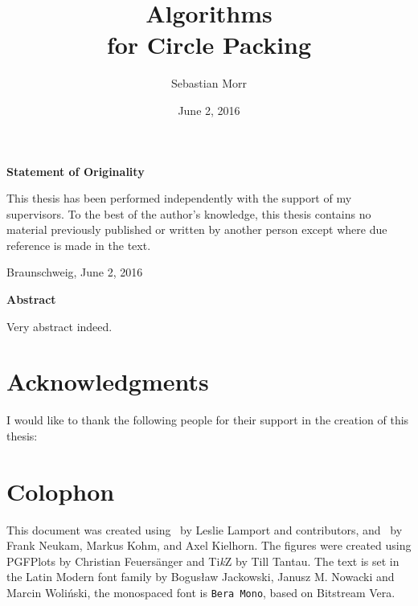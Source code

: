 \documentclass[a4paper,style=print,bibliography=totoc,nexus,lnum,extramargin]{tubsbook}
\title{Algorithms \\for Circle Packing}
\author{\sffamily\LARGE Sebastian Morr}
\date{\large June 2, 2016}
\begin{document}
\frontmatter %

\maketitle
\cleardoublepage

\thispagestyle{plain} %
\vspace*{7cm}
\centerline{\bfseries Statement of Originality}
\vspace*{1em}
\noindent
This thesis has been performed independently with the support of my supervisors.
To the best of the author's knowledge, this thesis contains no material previously
published or written by another person except where due reference is made in the text.

\par
  \bigskip\noindent Braunschweig, June 2, 2016 \par
  \vspace*{10mm}
  \hfill\hrulefill
\cleardoublepage

\thispagestyle{plain} %
\centerline{\bfseries Abstract}
\vspace*{1em}
\noindent
Very abstract indeed.
\cleardoublepage

\section*{Acknowledgments}

I would like to thank the following people for their support in the creation of this thesis:

\section*{Colophon}

This document was created using \LaTeXe\ by Leslie Lamport and contributors, and \KOMAScript\ by Frank Neukam, Markus Kohm, and Axel Kielhorn. The figures were created using PGFPlots by Christian Feuersänger and Ti\textit{k}Z by Till Tantau. The text is set in the Latin Modern font family by Bogusław Jackowski, Janusz M. Nowacki and Marcin Woliński, the monospaced font is \texttt{Bera Mono}, based on Bitstream Vera.

\cleardoublepage
\setcounter{tocdepth}{2}

\tableofcontents
\cleardoublepage

%
\end{document}
